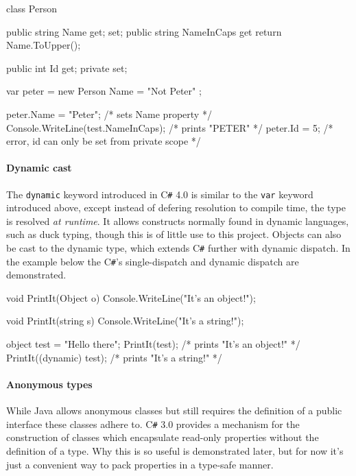 \documentclass[twoside,openright]{uva-bachelor-thesis}
\newcommand{\code}[1]{\texttt{\footnotesize#1}}
\newcommand{\cs}{C\texttt{\#}\xspace}
\begin{document}
			\begin{codespan}
				\begin{csharpcode}
					class Person
					{
						public string Name { get; set; }
						public string NameInCaps
						{
							get { return Name.ToUpper(); }
						}
						
						public int Id { get; private set; }
					}
					
					var peter = new Person
					{
						Name = "Not Peter"
					};
					
					peter.Name = "Peter";                /* sets Name property */
					Console.WriteLine(test.NameInCaps);  /* prints "PETER" */
					peter.Id = 5;                        /* error, id can only be set from private scope */
				\end{csharpcode}
			\end{codespan}
						
		\paragraph{Dynamic cast}
			The \code{dynamic} keyword introduced in \cs 4.0 is similar to the \code{var} keyword introduced above, except instead of defering resolution to compile time, the type is resolved \emph{at runtime}. It allows constructs normally found in dynamic languages, such as duck typing, though this is of little use to this project. Objects can also be cast to the dynamic type, which extends \cs further with dynamic dispatch. In the example below the \cs's single-dispatch and dynamic dispatch are demonstrated.
			
			\begin{codespan}
				\begin{csharpcode}
					void PrintIt(Object o)
					{
						Console.WriteLine("It's an object!");
					}
					
					void PrintIt(string s)
					{
						Console.WriteLine("It's a string!");
					}
					
					object test = "Hello there";
					PrintIt(test);               /* prints "It's an object!" */
					PrintIt((dynamic) test);     /* prints "It's a string!" */
				\end{csharpcode}
			\end{codespan}
			
		\paragraph{Anonymous types}
			While Java allows anonymous classes but still requires the definition of a public interface these classes adhere to. \cs 3.0 provides a mechanism for the construction of classes which encapsulate read-only properties without the definition of a type. Why this is so useful is demonstrated later, but for now it's just a convenient way to pack properties in a type-safe manner.
			
\end{document}
